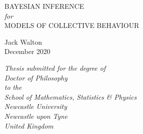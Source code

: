 \begin{titlepage}


  \begin{center}
    \huge{
        {\color{title-blue}\scshape BAYESIAN INFERENCE}\\
        \textsl{for}\\
        {\color{title-blue}\scshape MODELS OF COLLECTIVE BEHAVIOUR}
    }

    \vfill
    {\color{black!85}}
    \vfill

    \Large{Jack Walton}\\
  	\Large{December 2020}\\ 
 
    \vfill

    \emph{\small
      Thesis submitted for the degree of\\
      \hspace{2mm}
      Doctor of Philosophy\\
      \vspace{0.2cm}
      to the\\
      \vspace{0.1cm}
      School of Mathematics, Statistics \& Physics\\
      Newcastle University\\
      Newcastle upon Tyne\\
      United Kingdom\\
    }        

  \end{center}

\end{titlepage}

\thispagestyle{empty}
\cleardoublepage
